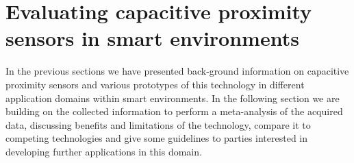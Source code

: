 \chapter{Evaluating capacitive proximity sensors in smart environments}
\label{ch:eval}
In the previous sections we have presented back-ground information on capacitive proximity sensors and various prototypes of this technology in different application domains within smart environments. In the following section we are building on the collected information to perform a meta-analysis of the acquired data, discussing benefits and limitations of the technology, compare it to competing technologies and give some guidelines to parties interested in developing further applications in this domain. 
%



